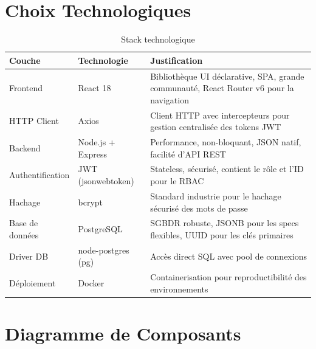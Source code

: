 \section{Choix Technologiques}

\begin{table}[h!]
\centering
\begin{tabularx}{\textwidth}{|l|l|X|}
\hline
\textbf{Couche} & \textbf{Technologie} & \textbf{Justification} \\
\hline
Frontend & React 18 & Bibliothèque UI déclarative, SPA, grande communauté, React Router v6 pour la navigation \\
\hline
HTTP Client & Axios & Client HTTP avec intercepteurs pour gestion centralisée des tokens JWT \\
\hline
Backend & Node.js + Express & Performance, non-bloquant, JSON natif, facilité d'API REST \\
\hline
Authentification & JWT (jsonwebtoken) & Stateless, sécurisé, contient le rôle et l'ID pour le RBAC \\
\hline
Hachage & bcrypt & Standard industrie pour le hachage sécurisé des mots de passe \\
\hline
Base de données & PostgreSQL & SGBDR robuste, JSONB pour les specs flexibles, UUID pour les clés primaires \\
\hline
Driver DB & node-postgres (pg) & Accès direct SQL avec pool de connexions \\
\hline
Déploiement & Docker & Containerisation pour reproductibilité des environnements \\
\hline
\end{tabularx}
\caption{Stack technologique}
\end{table}

\section{Diagramme de Composants}

